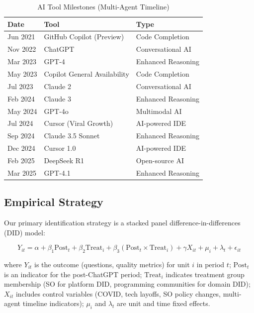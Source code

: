 \documentclass[11pt,a4paper]{article}
\begin{document}
\begin{table}[h]
\centering
\caption{AI Tool Milestones (Multi-Agent Timeline)}
\label{tab:timeline}
\begin{tabular}{lll}
\toprule
\textbf{Date} & \textbf{Tool} & \textbf{Type} \\
\midrule
Jun 2021 & GitHub Copilot (Preview) & Code Completion \\
Nov 2022 & ChatGPT & Conversational AI \\
Mar 2023 & GPT-4 & Enhanced Reasoning \\
May 2023 & Copilot General Availability & Code Completion \\
Jul 2023 & Claude 2 & Conversational AI \\
Feb 2024 & Claude 3 & Enhanced Reasoning \\
May 2024 & GPT-4o & Multimodal AI \\
Jul 2024 & Cursor (Viral Growth) & AI-powered IDE \\
Sep 2024 & Claude 3.5 Sonnet & Enhanced Reasoning \\
Dec 2024 & Cursor 1.0 & AI-powered IDE \\
Feb 2025 & DeepSeek R1 & Open-source AI \\
Mar 2025 & GPT-4.1 & Enhanced Reasoning \\
\bottomrule
\end{tabular}
\end{table}

\subsection{Empirical Strategy}

Our primary identification strategy is a stacked panel difference-in-differences (DID) model:

\begin{equation}
\label{eq:did}
Y_{it} = \alpha + \beta_1 \text{Post}_t + \beta_2 \text{Treat}_i + \beta_3 (\text{Post}_t \times \text{Treat}_i) + \gamma X_{it} + \mu_i + \lambda_t + \epsilon_{it}
\end{equation}

where $Y_{it}$ is the outcome (questions, quality metrics) for unit $i$ in period $t$; $\text{Post}_t$ is an indicator for the post-ChatGPT period; $\text{Treat}_i$ indicates treatment group membership (SO for platform DID, programming communities for domain DID); $X_{it}$ includes control variables (COVID, tech layoffs, SO policy changes, multi-agent timeline indicators); $\mu_i$ and $\lambda_t$ are unit and time fixed effects.
\end{document}
